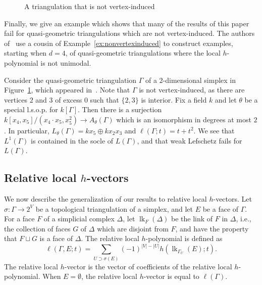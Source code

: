 \begin{figure}
\begin{center}
\end{center}
\caption{A triangulation that is not vertex-induced}\label{fig:noninduced}
\end{figure}

Finally, we give an example which shows that many of the results of this paper fail for quasi-geometric triangulations which are not vertex-induced. The authors of~\cite{JKSS} use a cousin of Example~\ref{ex:nonvertexinduced} to construct examples, starting when $d=4$, of quasi-geometric triangulations where the local $h$-polynomial is not unimodal.

\begin{example}\label{ex:nonvertexinduced}
Consider the quasi-geometric triangulation $\Gamma$ of a $2$-dimensional simplex in Figure~\ref{fig:noninduced}, which appeared in~\cite[Figure 1(c)]{JKSS}. Note that $\Gamma$ is not vertex-induced, as there are vertices $2$ and $3$ of excess $0$ such that $\{2, 3\}$ is interior. 
Fix a field $k$ 
and let $\theta$ be a special l.s.o.p. for $k[\Gamma]$. 
Then there is a surjection $k[x_4,x_5]/(x_4 \cdot x_5, x_5^2) \to A_\theta(\Gamma)$ which is an isomorphism in degrees at most $2$. 
In particular, $L_\theta(\Gamma) = k x_5 \oplus k x_2 x_3$ and $\ell(\Gamma; t) = t + t^2$. 
We see that $L^1(\Gamma)$ is contained in the socle of $L(\Gamma)$, and that weak Lefschetz fails for $L(\Gamma)$. 
\end{example}

\subsection{Relative local \texorpdfstring{$h$}{h}-vectors}\label{ssec:relative}

We now describe the generalization of our results to relative local $h$-vectors. Let $\sigma \colon \Gamma \to 2^V$ be a topological triangulation of a simplex, and let $E$ be a face of $\Gamma$. For a face $F$ of a simplicial complex $\Delta$, let $\operatorname{lk}_F(\Delta)$ be the link of $F$ in $\Delta$, i.e., the collection of faces $G$ of $\Delta$ which are disjoint from $F$, and have the property that $F \sqcup G$ is a face of $\Delta$. The relative local $h$-polynomial is defined as
$$\ell(\Gamma, E; t) = \sum_{U \supset \sigma(E)} (-1)^{|V| - |U|} h(\operatorname{lk}_{\Gamma_U}(E); t).$$
The relative local $h$-vector is the vector of coefficients of the relative local $h$-polynomial. When $E = \emptyset$, the relative local $h$-vector is equal to $\ell(\Gamma)$. 


